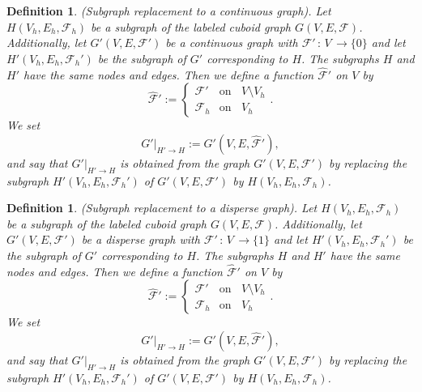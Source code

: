 \documentclass[a4paper,11pt]{article}
\newtheorem{definition}[theorem]{Definition}
\begin{document}
\begin{definition}(Subgraph replacement to a continuous graph). Let $H(V_h,E_h,\mathcal{F}_h)$ be a subgraph
of the labeled cuboid graph $G(V,E,\mathcal{F})$. Additionally, let $G'(V,E,\mathcal{F}')$ be a continuous graph
with $\mathcal{F}'\,:\,V\,\longrightarrow \{0\}$ and let $H'(V_h,E_h,\mathcal{F}_h')$ be the subgraph of $G'$
corresponding to $H$. The subgraphs $H$ and $H'$ have the same nodes and edges. Then we define a function
$\hat{\mathcal{F}}'$ on $V$ by
\begin{equation}
\hat{\mathcal{F}}':=\left\{
   \begin{array}{ll}
     \mathcal{F}' & \mbox{on }\;\; V\setminus V_h \\
     \mathcal{F}_h & \mbox{on }\;\; V_h
   \end{array}\right..
\label{eq:labeled-graph-7-1}
\end{equation}
We set
\begin{equation}
G'|_{H'\rightarrow H}:=G'(V,E,\hat{\mathcal{F}}'),
\label{eq:labeled-graph-8-1}
\end{equation}
and say that $G'|_{H'\rightarrow H}$ is obtained from the graph $G'(V,E,\mathcal{F}')$ by replacing
the subgraph $H'(V_h,E_h,\mathcal{F}_h')$ of $G'(V,E,\mathcal{F}')$ by $H(V_h,E_h,\mathcal{F}_h)$.
\label{def:labeled-graph-3-1}
\end{definition}

\begin{definition}(Subgraph replacement to a disperse graph). Let $H(V_h,E_h,\mathcal{F}_h)$ be a subgraph
of the labeled cuboid graph $G(V,E,\mathcal{F})$. Additionally, let $G'(V,E,\mathcal{F}')$ be a disperse graph
with $\mathcal{F}'\,:\,V\,\longrightarrow \{1\}$ and let $H'(V_h,E_h,\mathcal{F}_h')$ be the subgraph of $G'$
corresponding to $H$. The subgraphs $H$ and $H'$ have the same nodes and edges. Then we define a function
$\hat{\mathcal{F}}'$
on $V$ by
\begin{equation}
\hat{\mathcal{F}}':=\left\{
   \begin{array}{ll}
     \mathcal{F}' & \mbox{on }\;\; V\setminus V_h \\
     \mathcal{F}_h & \mbox{on }\;\; V_h
   \end{array}\right..
\label{eq:labeled-graph-7-2}
\end{equation}
We set
\begin{equation}
G'|_{H'\rightarrow H}:=G'(V,E,\hat{\mathcal{F}}'),
\label{eq:labeled-graph-8-2}
\end{equation}
and say that $G'|_{H'\rightarrow H}$ is obtained from the graph $G'(V,E,\mathcal{F}')$ by replacing
the subgraph $H'(V_h,E_h,\mathcal{F}_h')$ of $G'(V,E,\mathcal{F}')$ by $H(V_h,E_h,\mathcal{F}_h)$.
\label{def:labeled-graph-3-2}
\end{definition}
\end{document}
